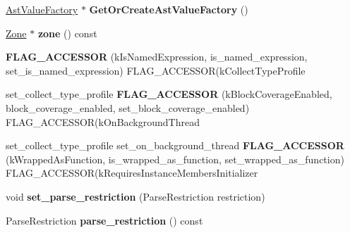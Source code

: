 \begin{DoxyCompactItemize}
\item 
\mbox{\label{classv8_1_1internal_1_1ParseInfo_a7c1963022f6bda85bd518b39211f3047}} 
\mbox{\hyperlink{classv8_1_1internal_1_1AstValueFactory}{Ast\+Value\+Factory}} $\ast$ {\bfseries Get\+Or\+Create\+Ast\+Value\+Factory} ()
\item 
\mbox{\label{classv8_1_1internal_1_1ParseInfo_a337e84e68da04c6dabee91cfc3038bb3}} 
\mbox{\hyperlink{classv8_1_1internal_1_1Zone}{Zone}} $\ast$ {\bfseries zone} () const
\item 
\mbox{\label{classv8_1_1internal_1_1ParseInfo_abc5b05ea057635cd8f6932993f74ca7e}} 
{\bfseries F\+L\+A\+G\+\_\+\+A\+C\+C\+E\+S\+S\+OR} (k\+Is\+Named\+Expression, is\+\_\+named\+\_\+expression, set\+\_\+is\+\_\+named\+\_\+expression) F\+L\+A\+G\+\_\+\+A\+C\+C\+E\+S\+S\+OR(k\+Collect\+Type\+Profile
\item 
\mbox{\label{classv8_1_1internal_1_1ParseInfo_a9aa976931663ffcf13cead5bb9ded52e}} 
set\+\_\+collect\+\_\+type\+\_\+profile {\bfseries F\+L\+A\+G\+\_\+\+A\+C\+C\+E\+S\+S\+OR} (k\+Block\+Coverage\+Enabled, block\+\_\+coverage\+\_\+enabled, set\+\_\+block\+\_\+coverage\+\_\+enabled) F\+L\+A\+G\+\_\+\+A\+C\+C\+E\+S\+S\+OR(k\+On\+Background\+Thread
\item 
\mbox{\label{classv8_1_1internal_1_1ParseInfo_ad672e0681afb34bfe718a5a6180caa0c}} 
set\+\_\+collect\+\_\+type\+\_\+profile set\+\_\+on\+\_\+background\+\_\+thread {\bfseries F\+L\+A\+G\+\_\+\+A\+C\+C\+E\+S\+S\+OR} (k\+Wrapped\+As\+Function, is\+\_\+wrapped\+\_\+as\+\_\+function, set\+\_\+wrapped\+\_\+as\+\_\+function) F\+L\+A\+G\+\_\+\+A\+C\+C\+E\+S\+S\+OR(k\+Requires\+Instance\+Members\+Initializer
\item 
\mbox{\label{classv8_1_1internal_1_1ParseInfo_a547d00bbf2b12228b20997a08e71132e}} 
void {\bfseries set\+\_\+parse\+\_\+restriction} (Parse\+Restriction restriction)
\item 
\mbox{\label{classv8_1_1internal_1_1ParseInfo_aeaaf09de4cc6b1e27e9417315e8b17b7}} 
Parse\+Restriction {\bfseries parse\+\_\+restriction} () const

\end{DoxyCompactItemize}

